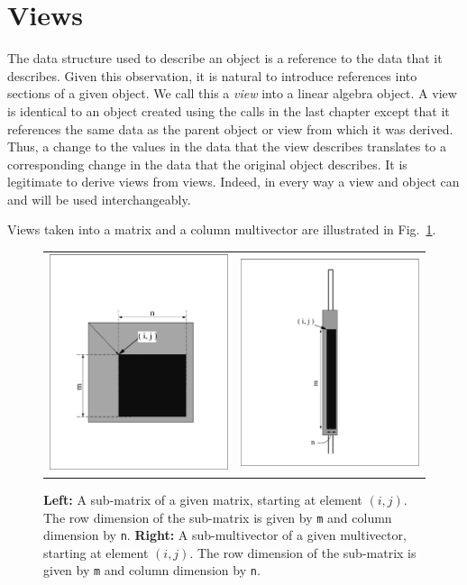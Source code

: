 \section{Views}

The data structure used to describe an object is a
reference to the data that it describes.  
Given this observation, it is natural to introduce
references into sections of a given object. 
We call this a {\em view} into a linear algebra object.
A view is identical to an object created using
the calls in the last chapter
except that it references the same data as the parent object or view
from which it was derived.  
Thus, a change to the values in the data that
the view describes translates to a corresponding change in the data
that the original object describes.  
It is legitimate to derive views from views. 
Indeed, in every way a view and object can and will be used interchangeably.

Views taken into a matrix and a column multivector are illustrated in
Fig.~\ref{fig:views}.  
\begin{figure}[htbp]
\begin{center}
\begin{tabular}{ c c }
\includegraphics[height=2.5in,width=2.5in]{figures/matsubview.eps} 
&
\includegraphics[height=2.5in,width=2.5in]{figures/mvectsubview.eps}
\\
\end{tabular}
\end{center}
\caption{
{\bf Left:}
A sub-matrix of a given matrix, starting at element
$ (i,j)$.
The row dimension of the sub-matrix is given by {\tt m}
and column dimension by {\tt n}.
{\bf Right:} 
A sub-multivector of a given multivector, starting at element
$ (i,j)$.
The row dimension of the sub-matrix is given by {\tt m}
and column dimension by {\tt n}.
}
\label{fig:views}
\end{figure}


